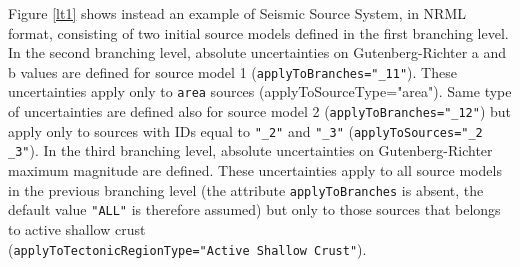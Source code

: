 Figure \ref{lt1} shows instead an example of Seismic Source System, in NRML format, consisting of two initial source models defined in the first branching level. In the second branching level, absolute uncertainties on Gutenberg-Richter a and b values are defined for source model 1 (\Verb+applyToBranches="_11"+). These uncertainties apply only to \Verb+area+ sources (applyToSourceType="area"). Same type of uncertainties are defined also for source model 2 (\Verb+applyToBranches="_12"+) but apply only to sources with IDs equal to \Verb+"_2"+ and \Verb+"_3"+ (\Verb+applyToSources="_2 _3"+). In the third branching level, absolute uncertainties on Gutenberg-Richter maximum magnitude are defined. These uncertainties apply to all source models in the previous branching level (the attribute \Verb+applyToBranches+ is absent, the default value \Verb+"ALL"+ is therefore assumed) but only to those sources that belongs to active shallow crust\\ (\Verb+applyToTectonicRegionType="Active Shallow Crust"+).
